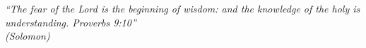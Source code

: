 \begin{epigrafe}
    \vspace*{\fill}
	\begin{flushright}
		\textit{``The fear of the Lord is the beginning of wisdom: and the knowledge of the holy is understanding. Proverbs 9:10''\\
		(Solomon)}
	\end{flushright}
\end{epigrafe}
